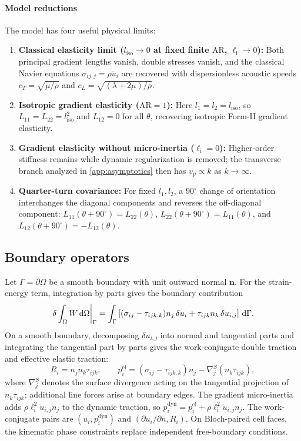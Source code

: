 \paragraph{Model reductions}
The model has four useful physical limits:
\begin{enumerate}[label=(\roman*)]
  \item \textbf{Classical elasticity limit ($l_{\mathrm{iso}} \to 0$ at fixed finite $\mathrm{AR}$, $\ell_{\mathrm{i}} \to 0$):} Both principal gradient lengths vanish, double stresses vanish, and the classical Navier equations $\sigma_{ij,j}=\rho\ddot u_i$ are recovered with dispersionless acoustic speeds $c_T=\sqrt{\mu/\rho}$ and $c_L=\sqrt{(\lambda+2\mu)/\rho}$.
  \item \textbf{Isotropic gradient elasticity ($\mathrm{AR} = 1$):} Here $l_1 = l_2 = l_{\mathrm{iso}}$, so $L_{11} = L_{22} = l_{\mathrm{iso}}^2$ and $L_{12} = 0$ for all $\theta$, recovering isotropic Form-II gradient elasticity.
  \item \textbf{Gradient elasticity without micro-inertia ($\ell_{\mathrm{i}} = 0$):} Higher-order stiffness remains while dynamic regularization is removed; the transverse branch analyzed in \ref{app:asymptotics} then has $v_p\propto k$ as $k\to\infty$.
  \item \textbf{Quarter-turn covariance:} For fixed $l_1,l_2$, a $90^\circ$ change of orientation interchanges the diagonal components and reverses the off-diagonal component: $L_{11}(\theta+90^\circ)=L_{22}(\theta)$, $L_{22}(\theta+90^\circ)=L_{11}(\theta)$, and $L_{12}(\theta+90^\circ)=-L_{12}(\theta)$.
\end{enumerate}

\subsection{Boundary operators}
Let $\Gamma=\partial\Omega$ be a smooth boundary with unit outward normal $\bm n$. For the strain-energy term, integration by parts gives the boundary contribution
\begin{equation}
\left.\delta\int_\Omega W\,\mathrm{d}\Omega\right|_\Gamma
= \int_\Gamma \left[(\sigma_{ij}-\tau_{ijk,k})n_j\,\delta u_i + \tau_{ijk}n_k\,\delta u_{i,j}\right] \,\mathrm{d}\Gamma.
\label{eq:elastic_boundary_work}
\end{equation}
On a smooth boundary, decomposing $\delta u_{i,j}$ into normal and tangential parts and integrating the tangential part by parts gives the work-conjugate double traction and effective elastic traction:
\begin{equation}
R_i = n_jn_k\tau_{ijk}, \qquad p_i^{\mathrm{el}} = (\sigma_{ij}-\tau_{ijk,k})n_j - \nabla_j^S(n_k\tau_{ijk}),
\label{eq:traction_def}
\end{equation}
where $\nabla_j^S$ denotes the surface divergence acting on the tangential projection of $n_k\tau_{ijk}$; additional line forces arise at boundary edges. The gradient micro-inertia adds $\rho\ell_{\mathrm{i}}^2\ddot u_{i,j}n_j$ to the dynamic traction, so $p_i^{\mathrm{dyn}}=p_i^{\mathrm{el}}+\rho\ell_{\mathrm{i}}^2\ddot u_{i,j}n_j$. The work-conjugate pairs are $(u_i,p_i^{\mathrm{dyn}})$ and $(\partial u_i/\partial n,R_i)$. On Bloch-paired cell faces, the kinematic phase constraints replace independent free-boundary conditions.
